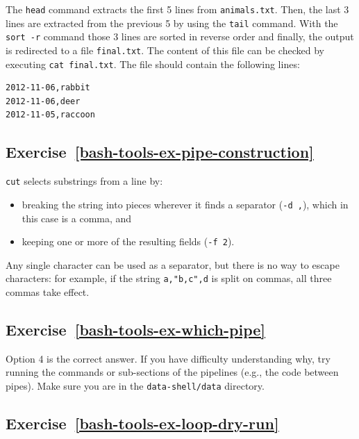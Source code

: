 \documentclass[
]{krantz}
\providecommand{\tightlist}{%
  \setlength{\itemsep}{0pt}\setlength{\parskip}{0pt}}
\begin{document}
The \texttt{head} command extracts the first 5 lines from \texttt{animals.txt}.
Then, the last 3 lines are extracted from the previous 5 by using the \texttt{tail} command.
With the \texttt{sort\ -r} command those 3 lines are sorted in reverse order and finally,
the output is redirected to a file \texttt{final.txt}.
The content of this file can be checked by executing \texttt{cat\ final.txt}.
The file should contain the following lines:

\begin{verbatim}
2012-11-06,rabbit
2012-11-06,deer
2012-11-05,raccoon
\end{verbatim}

\hypertarget{exercise-refbash-tools-ex-pipe-construction}{%
\subsection*{Exercise~\ref{bash-tools-ex-pipe-construction}}\label{exercise-refbash-tools-ex-pipe-construction}}


\texttt{cut} selects substrings from a line by:

\begin{itemize}
\tightlist
\item
  breaking the string into pieces wherever it finds a separator (\texttt{-d\ ,}),
  which in this case is a comma, and
\item
  keeping one or more of the resulting fields (\texttt{-f\ 2}).
\end{itemize}

Any single character can be used as a separator,
but there is no way to escape characters:
for example, if the string \texttt{a,"b,c",d} is split on commas,
all three commas take effect.

\hypertarget{exercise-refbash-tools-ex-which-pipe}{%
\subsection*{Exercise~\ref{bash-tools-ex-which-pipe}}\label{exercise-refbash-tools-ex-which-pipe}}


Option 4 is the correct answer.
If you have difficulty understanding why,
try running the commands or sub-sections of the pipelines
(e.g., the code between pipes).
Make sure you are in the \texttt{data-shell/data} directory.

\hypertarget{exercise-refbash-tools-ex-loop-dry-run}{%
\subsection*{Exercise~\ref{bash-tools-ex-loop-dry-run}}\label{exercise-refbash-tools-ex-loop-dry-run}}
\end{document}

